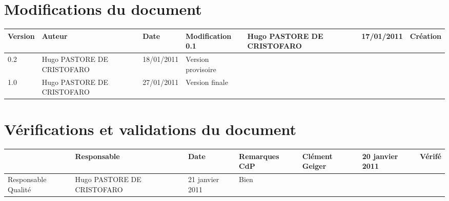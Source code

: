 
\section*{Modifications du document}

\begin{center}
\begin{longtable}{|m{14mm}||m{36mm}|m{36mm}|m{60mm}|}
\hline
Version & Auteur & Date & Modification\endhead \hline
0.1
& %
Hugo PASTORE DE CRISTOFARO
& %
17/01/2011
& %
Création
\\\hline
0.2
& %
Hugo PASTORE DE CRISTOFARO
& %
18/01/2011
& %
Version provisoire
\\\hline
1.0
& %
Hugo PASTORE DE CRISTOFARO
& %
27/01/2011
& %
Version finale
\\\hline
\end{longtable}
\end{center}


\section*{Vérifications et validations du document}

\begin{center}
\begin{longtable}{|m{15mm}|m{36mm}|m{36mm}|m{60mm}|}
\hline
 & Responsable & Date & Remarques\endhead \hline
CdP
& %
Clément Geiger
& %
20 janvier 2011
& %
Vérifé
\\\hline
Responsable Qualité
& %
Hugo PASTORE DE CRISTOFARO
& %
21 janvier 2011
& %
Bien
\\\hline
\end{longtable}
\end{center}

\pagebreak
